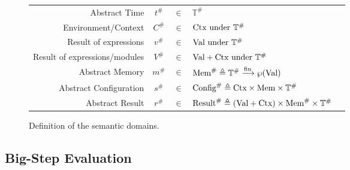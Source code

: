 \documentclass[acmsmall,screen,review]{acmart}
\theoremstyle{definition}
\newcommand*{\A}[1]{{#1}^{\#}}
\newcommand*{\Time}{\mathbb{T}}
\newcommand*{\ATime}{\A{\Time}}
\newcommand*{\Ctx}[1]{\text{Ctx}\vphantom{#1}}
\newcommand*{\Value}[1]{\text{Val}\vphantom{#1}}
\newcommand*{\Mem}[1]{\text{Mem}\vphantom{#1}}
\newcommand*{\mem}{m}
\newcommand*{\AMem}[1]{\A{\text{Mem}}\vphantom{#1}}
\newcommand*{\AConfig}[1]{\A{\text{Config}}\vphantom{#1}}
\newcommand*{\AResult}[1]{\A{\text{Result}}\vphantom{#1}}
\newcommand*{\fin}[2]{{#1}\xrightarrow{\text{fin}}{#2}}
\begin{document}
\begin{figure}[htb]
  \centering
  \footnotesize
  \begin{tabular}{rccll}
    Abstract Time                 & $\A{t}$  & $\in$ & $\ATime$                                                                                   \\
    Environment/Context           & $\A{C}$  & $\in$ & $\Ctx\ATime\text{ under }\ATime$                                                           \\
    Result of expressions         & $\A{v}$  & $\in$ & $\Value\ATime\text{ under }\ATime$                                                         \\
    Result of expressions/modules & $\A{V}$  & $\in$ & $\Value{\ATime}+\Ctx{\ATime}\text{ under }\ATime$                                          \\
    Abstract Memory               & $\A\mem$ & $\in$ & $\AMem{\ATime} \triangleq \fin{\ATime}{\wp(\Value{\ATime})}$                               \\
    Abstract Configuration        & $\A{s}$  & $\in$ & $\AConfig{\ATime} \triangleq \Ctx{\ATime}\times\Mem{\ATime}\times\ATime$                   \\
    Abstract Result               & $\A{r}$  & $\in$ & $\AResult{\ATime} \triangleq (\Value{\ATime}+\Ctx{\ATime})\times\AMem{\ATime}\times\ATime$ \\
  \end{tabular}
  \caption{Definition of the semantic domains.}
\end{figure}

\subsection{Big-Step Evaluation}
\end{document}
